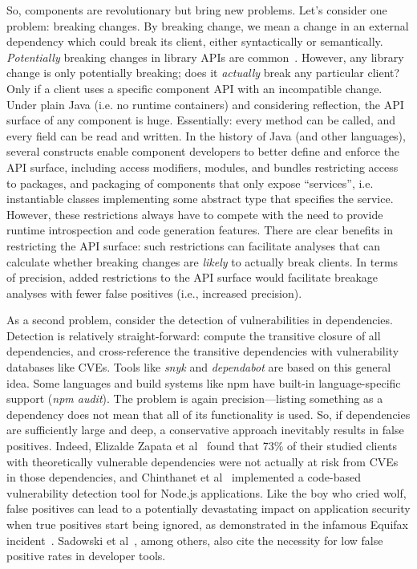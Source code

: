 So, components are revolutionary but bring new problems. Let's consider one problem: breaking changes. By breaking change, we mean a change in an external dependency which could break its client, either syntactically or semantically. \textit{Potentially} breaking changes in library APIs are common~\cite{dietrich2014broken,raemaekers2014semantic}. However, any library change is only potentially breaking; does it \textit{actually} break any particular client? Only if a client uses a specific component API with an incompatible change. Under plain Java (i.e. no runtime containers) and considering reflection, the API surface of any component is huge. Essentially: every method can be called, and every field can be read and written. In the history of Java (and other languages), several constructs enable component developers to better define and enforce the API surface, including access modifiers, modules, and bundles restricting access to packages, and packaging of components that only expose ``services'', i.e. instantiable classes implementing some abstract type that specifies the service. However, these restrictions always have to compete with the need to provide runtime introspection and code generation features. There are clear benefits in restricting the API surface: such restrictions can facilitate analyses that can calculate whether breaking changes are \textit{likely} to actually break clients.  In terms of precision, added restrictions to the API surface would facilitate breakage analyses with fewer false positives (i.e., increased precision). 

As a second problem, consider the detection of vulnerabilities in dependencies. Detection is relatively straight-forward: compute the transitive closure of all dependencies, and cross-reference the transitive dependencies with vulnerability databases like CVEs. Tools like \textit{snyk} and \textit{dependabot} are based on this general idea. Some languages and build systems like npm have built-in language-specific support (\textit{npm audit}). The problem is again precision---listing something as a dependency does not mean that all of its functionality is used. So, if dependencies are sufficiently large and deep, a conservative approach inevitably results in false positives. Indeed, Elizalde Zapata et al~\cite{elizalde18:_towar_smoot_librar_migrat} found that 73\% of their studied clients with theoretically vulnerable dependencies were not actually at risk from CVEs in those dependencies, and Chinthanet et al~\cite{chinthanet20:_code_based_vulner_detec_node} implemented a code-based vulnerability detection tool for Node.js applications. Like the boy who cried wolf, false positives can lead to a potentially devastating impact on application security when true positives start being ignored, as demonstrated in the infamous Equifax incident~\cite{luszcz2018apache}. Sadowski et al~\cite{sadowski2018lessons}, among others, also cite the necessity for low false positive rates in developer tools.

